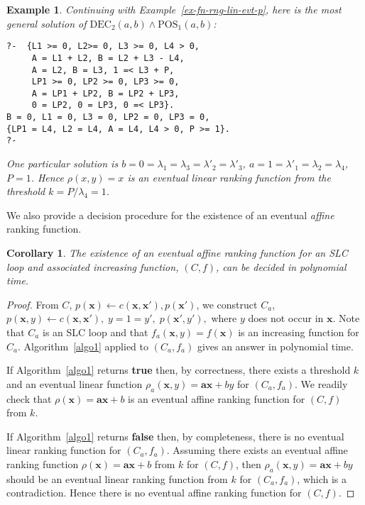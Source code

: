 \documentclass{acm_proc_article-sp}
\newtheorem{corollary}[theorem]{Corollary}
\newtheorem{example}[theorem]{Example}
\newcommand{\dec}{\mathrm{DEC}}
\newcommand{\pos}{\mathrm{POS}}
\begin{document}
\begin{example}
Continuing with \textup{Example~\ref{ex-fn-rng-lin-evt-p}},
here is the most general solution of $\dec_2(a, b) \land \pos_1(a, b)$:
\begin{verbatim}
?-  {L1 >= 0, L2>= 0, L3 >= 0, L4 > 0,
     A = L1 + L2, B = L2 + L3 - L4,
     A = L2, B = L3, 1 =< L3 + P,
     LP1 >= 0, LP2 >= 0, LP3 >= 0,
     A = LP1 + LP2, B = LP2 + LP3,
     0 = LP2, 0 = LP3, 0 =< LP3}.
B = 0, L1 = 0, L3 = 0, LP2 = 0, LP3 = 0,
{LP1 = L4, L2 = L4, A = L4, L4 > 0, P >= 1}.
?-
\end{verbatim}
One particular solution is
$b = 0 = \lambda_1  = \lambda_3 = \lambda'_2 = \lambda'_3$,
$a = 1 = \lambda'_1 = \lambda_2 = \lambda_4$,
$P = 1$.
Hence $\rho(x, y) = x$ is an eventual linear ranking function
from the threshold $k = P/\lambda_4 = 1$.
\end{example}

We also provide a decision procedure for the existence
of an eventual \emph{affine} ranking function.

\begin{corollary}
The existence of an eventual affine ranking function for
an SLC loop and associated increasing function, $(C, f)$,
can be decided in polynomial time.
\end{corollary}
\begin{proof}
From $C$,
$p(\mathbf{x}) \leftarrow c(\mathbf{x},\mathbf{x}'), p(\mathbf{x}')$,
we construct $C_a$,
\(
  p(\mathbf{x},y)
    \leftarrow c(\mathbf{x},\mathbf{x}'), \; y = 1 = y', \; p(\mathbf{x}',y'),
\) where $y$ does not occur in $\mathbf{x}$.
Note that $C_a$ is an SLC loop and that $f_a(\mathbf{x},y) = f(\mathbf{x})$
is an increasing function for $C_a$.
Algorithm~\ref{algo1} applied to $(C_a, f_a)$
gives an answer in polynomial time.

If Algorithm~\ref{algo1} returns \textbf{true} then, by correctness,
there exists a threshold $k$ and an eventual linear function
$\rho_a(\mathbf{x},y) = \mathbf{a} \mathbf{x} + b y$ for $(C_a, f_a)$.
We readily check that $\rho(\mathbf{x}) = \mathbf{a}\mathbf{x} + b$
is an eventual affine ranking function for $(C, f)$ from $k$.

If Algorithm~\ref{algo1} returns \textbf{false} then, by completeness,
there is no eventual linear ranking function for $(C_a, f_a)$.
Assuming there exists an eventual affine ranking function
$\rho(\mathbf{x}) = \mathbf{a} \mathbf{x} + b$ from $k$ for $(C, f)$, then
$\rho_a(\mathbf{x},y) = \mathbf{a} \mathbf{x} + b y$ should be an
eventual linear ranking function from $k$ for $(C_a,f_a)$,
which is a contradiction.
Hence there is no eventual affine ranking function for $(C, f)$.
\end{proof}
\end{document}
